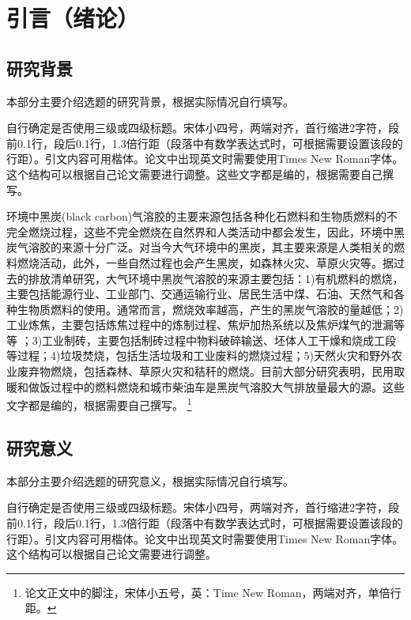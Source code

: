 \chapter{引言（绪论）}

\section{研究背景}

本部分主要介绍选题的研究背景，根据实际情况自行填写。

自行确定是否使用三级或四级标题。宋体小四号，两端对齐，首行缩进2字符，段前0.1行，段后0.1行，1.3倍行距（段落中有数学表达式时，可根据需要设置该段的行距）。引文内容可用楷体。论文中出现英文时需要使用Times New Roman字体。这个结构可以根据自己论文需要进行调整。这些文字都是编的，根据需要自己撰写。

环境中黑炭(black carbon)气溶胶的主要来源包括各种化石燃料和生物质燃料的不完全燃烧过程，这些不完全燃烧在自然界和人类活动中都会发生，因此，环境中黑炭气溶胶的来源十分广泛\cite{usa1}。对当今大气环境中的黑炭，其主要来源是人类相关的燃料燃烧活动，此外，一些自然过程也会产生黑炭，如森林火灾、草原火灾等\cite{wang2,3}。据过去的排放清单研究，大气环境中黑炭气溶胶的来源主要包括：1)有机燃料的燃烧，主要包括能源行业、工业部门、交通运输行业、居民生活中煤、石油、天然气和各种生物质燃料的使用。通常而言，燃烧效率越高，产生的黑炭气溶胶的量越低；2)工业炼焦，主要包括炼焦过程中的炼制过程、焦炉加热系统以及焦炉煤气的泄漏等等 ；3)工业制砖，主要包括制砖过程中物料破碎输送、坯体人工干燥和烧成工段等过程；4)垃圾焚烧，包括生活垃圾和工业废料的燃烧过程；5)天然火灾和野外农业废弃物燃烧，包括森林、草原火灾和秸秆的燃烧。目前大部分研究表明，民用取暖和做饭过程中的燃料燃烧和城市柴油车是黑炭气溶胶大气排放量最大的源\cite{4,5,6,7}。这些文字都是编的，根据需要自己撰写。
\footnote{ 论文正文中的脚注，宋体小五号，英：Time New Roman，两端对齐，单倍行距。}

 
\section{研究意义}
本部分主要介绍选题的研究意义，根据实际情况自行填写。

自行确定是否使用三级或四级标题。宋体小四号，两端对齐，首行缩进2字符，段前0.1行，段后0.1行，1.3倍行距（段落中有数学表达式时，可根据需要设置该段的行距）。引文内容可用楷体。论文中出现英文时需要使用Times New Roman字体。这个结构可以根据自己论文需要进行调整。



